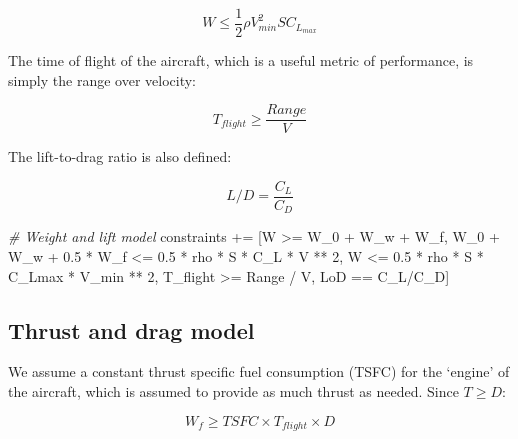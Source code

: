 \documentclass[]{article}
\newenvironment{Shaded}{}{}
\newcommand{\DecValTok}[1]{\textcolor[rgb]{0.25,0.63,0.44}{#1}}
\newcommand{\FloatTok}[1]{\textcolor[rgb]{0.25,0.63,0.44}{#1}}
\newcommand{\CommentTok}[1]{\textcolor[rgb]{0.38,0.63,0.69}{\textit{#1}}}
\newcommand{\OperatorTok}[1]{\textcolor[rgb]{0.40,0.40,0.40}{#1}}
\newcommand{\NormalTok}[1]{#1}
\begin{document}
\begin{equation}
    W \leq \frac{1}{2} \rho V_{min}^2 S C_{L_{max}}
\end{equation}

The time of flight of the aircraft, which is a useful metric of
performance, is simply the range over velocity:

\begin{equation}
    T_{flight} \geq \frac{Range}{V}
\end{equation}

The lift-to-drag ratio is also defined:

\begin{equation}
    L/D = \frac{C_L}{C_D}    
\end{equation}

\begin{Shaded}
\begin{Highlighting}[]
        \CommentTok{# Weight and lift model}
\NormalTok{        constraints }\OperatorTok{+=}\NormalTok{ [W }\OperatorTok{>=}\NormalTok{ W_0 }\OperatorTok{+}\NormalTok{ W_w }\OperatorTok{+}\NormalTok{ W_f,}
\NormalTok{                W_0 }\OperatorTok{+}\NormalTok{ W_w }\OperatorTok{+} \FloatTok{0.5} \OperatorTok{*}\NormalTok{ W_f }\OperatorTok{<=} 
                        \FloatTok{0.5} \OperatorTok{*}\NormalTok{ rho }\OperatorTok{*}\NormalTok{ S }\OperatorTok{*}\NormalTok{ C_L }\OperatorTok{*}\NormalTok{ V }\OperatorTok{**} \DecValTok{2}\NormalTok{,}
\NormalTok{                W }\OperatorTok{<=} \FloatTok{0.5} \OperatorTok{*}\NormalTok{ rho }\OperatorTok{*}\NormalTok{ S }\OperatorTok{*}\NormalTok{ C_Lmax }\OperatorTok{*}\NormalTok{ V_min }\OperatorTok{**} \DecValTok{2}\NormalTok{,}
\NormalTok{                T_flight }\OperatorTok{>=}\NormalTok{ Range }\OperatorTok{/}\NormalTok{ V,}
\NormalTok{                LoD }\OperatorTok{==}\NormalTok{ C_L}\OperatorTok{/}\NormalTok{C_D]}
\end{Highlighting}
\end{Shaded}

\subsection{Thrust and drag model}\label{thrust-and-drag-model}

We assume a constant thrust specific fuel consumption (TSFC) for the
`engine' of the aircraft, which is assumed to provide as much thrust as
needed. Since \(T \geq D\):

\begin{equation}
    W_f \geq TSFC \times T_{flight} \times D
\end{equation}
\end{document}
